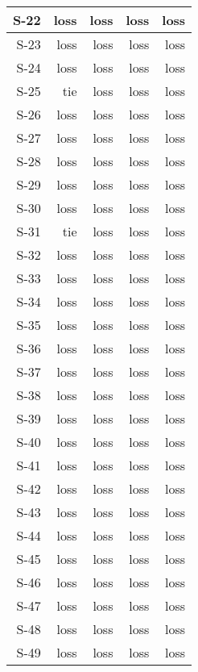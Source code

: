 \begin{tabular}{ | r | r | r | r | r | }
    \hline
         S-22  &   loss  &   loss  &   loss  &   loss  \\
    \hline
         S-23  &   loss  &   loss  &   loss  &   loss  \\
    \hline
         S-24  &   loss  &   loss  &   loss  &   loss  \\
    \hline
         S-25  &    tie  &   loss  &   loss  &   loss  \\
    \hline
         S-26  &   loss  &   loss  &   loss  &   loss  \\
    \hline
         S-27  &   loss  &   loss  &   loss  &   loss  \\
    \hline
         S-28  &   loss  &   loss  &   loss  &   loss  \\
    \hline
         S-29  &   loss  &   loss  &   loss  &   loss  \\
    \hline
         S-30  &   loss  &   loss  &   loss  &   loss  \\
    \hline
         S-31  &    tie  &   loss  &   loss  &   loss  \\
    \hline
         S-32  &   loss  &   loss  &   loss  &   loss  \\
    \hline
         S-33  &   loss  &   loss  &   loss  &   loss  \\
    \hline
         S-34  &   loss  &   loss  &   loss  &   loss  \\
    \hline
         S-35  &   loss  &   loss  &   loss  &   loss  \\
    \hline
         S-36  &   loss  &   loss  &   loss  &   loss  \\
    \hline
         S-37  &   loss  &   loss  &   loss  &   loss  \\
    \hline
         S-38  &   loss  &   loss  &   loss  &   loss  \\
    \hline
         S-39  &   loss  &   loss  &   loss  &   loss  \\
    \hline
         S-40  &   loss  &   loss  &   loss  &   loss  \\
    \hline
         S-41  &   loss  &   loss  &   loss  &   loss  \\
    \hline
         S-42  &   loss  &   loss  &   loss  &   loss  \\
    \hline
         S-43  &   loss  &   loss  &   loss  &   loss  \\
    \hline
         S-44  &   loss  &   loss  &   loss  &   loss  \\
    \hline
         S-45  &   loss  &   loss  &   loss  &   loss  \\
    \hline
         S-46  &   loss  &   loss  &   loss  &   loss  \\
    \hline
         S-47  &   loss  &   loss  &   loss  &   loss  \\
    \hline
         S-48  &   loss  &   loss  &   loss  &   loss  \\
    \hline
         S-49  &   loss  &   loss  &   loss  &   loss  \\
    \hline
\end{tabular}


